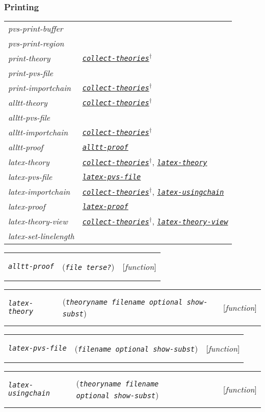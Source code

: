 \documentclass[12pt]{book}
\makeatletter
\def\ampoptional{{\smaller\sc {\smaller\smaller \&}optional\ }}
\newenvironment{function}[3]%
{\par\noindent\begin{boxedminipage}{\textwidth}%
 \par\noindent\begin{tabularx}{\linewidth}{l>{\raggedright}Xr}%
 \functionhtgt{#1}&(\texttt{\textit{#2}})&[\emph{#3}]%
 \end{tabularx}\par\flushright\begin{minipage}{.97\textwidth}}
{\end{minipage}\end{boxedminipage}}
\newcommand{\functionnm}[1]{\texttt{\textit{#1}}}
\newcommand{\functionhln}[1]{\hyperlink{#1}{\functionnm{#1}}}
\newcommand{\functionhtgt}[1]{\hypertarget{#1}{\functionnm{#1}}\index{#1@\functionnm{#1}|underline}}
\newenvironment{lispfunction}[2]%
{\begin{function}{#1}{#2}{function}}{\end{function}}
\makeatother
\begin{document}
\subsubsection{Printing}
\noindent\begin{tabularx}{\linewidth}{|>{\itshape\ttfamily}l|>{\raggedright\arraybackslash}X|}\hline
  pvs-print-buffer & \\
  pvs-print-region & \\
  print-theory & \functionhln{collect-theories}$^\dagger$ \\
  print-pvs-file & \\
  print-importchain & \functionhln{collect-theories}$^\dagger$ \\
  alltt-theory & \functionhln{collect-theories}$^\dagger$ \\
  alltt-pvs-file & \\
  alltt-importchain & \functionhln{collect-theories}$^\dagger$ \\
  alltt-proof & \functionhln{alltt-proof} \\
  latex-theory & \functionhln{collect-theories}$^\dagger$,
                 \functionhln{latex-theory} \\
  latex-pvs-file & \functionhln{latex-pvs-file} \\
  latex-importchain & \functionhln{collect-theories}$^\dagger$,
                      \functionhln{latex-usingchain} \\
  latex-proof & \functionhln{latex-proof} \\
  latex-theory-view & \functionhln{collect-theories}$^\dagger$,
                      \functionhln{latex-theory-view} \\
  latex-set-linelength & \\ \hline
\end{tabularx}

\begin{lispfunction}{alltt-proof}{file terse?}
\end{lispfunction}

\begin{lispfunction}{latex-theory}{theoryname filename \ampoptional show-subst}
\end{lispfunction}

\begin{lispfunction}{latex-pvs-file}{filename \ampoptional show-subst}
\end{lispfunction}

\begin{lispfunction}{latex-usingchain}
  {theoryname filename \ampoptional show-subst}
\end{lispfunction}
\end{document}
